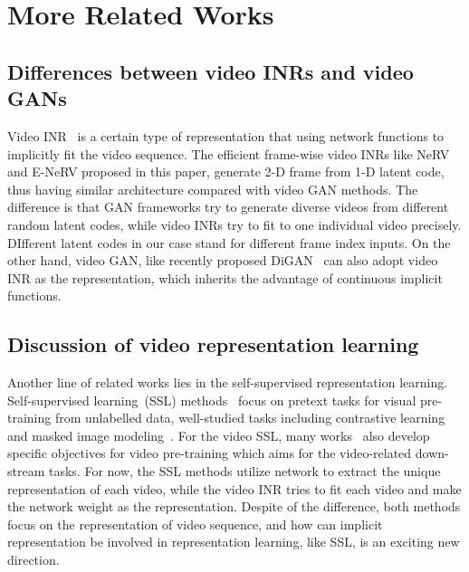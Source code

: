 \documentclass[runningheads]{llncs}
\begin{document}
\section{More Related Works}

\subsection{Differences between video INRs and video GANs}

Video INR~\cite{sitzmann2020implicit,mehta2021modulated} is a certain type of representation that using network functions to implicitly fit the video sequence. The efficient frame-wise video INRs like NeRV~\cite{chen2021nerv} and E-NeRV proposed in this paper, generate 2-D frame from 1-D latent code, thus having similar architecture compared with video GAN methods.  The difference is that GAN frameworks try to generate diverse videos from different random latent codes, while video INRs try to fit to one individual video precisely. DIfferent latent codes in our case stand for different frame index inputs. On the other hand, video GAN, like recently proposed DiGAN~\cite{yu2021generating} can also adopt video INR as the representation, which inherits the advantage of continuous implicit functions.

\subsection{Discussion of video representation learning}

Another line of related works lies in the self-supervised representation learning. Self-supervised learning~(SSL) methods~\cite{wu2018unsupervised,he2020momentum,chen2020simple,chen2021exploring,wang2021solving,he2022masked,chen2022context} focus on pretext tasks for visual pre-training from unlabelled data, well-studied tasks including contrastive learning~\cite{he2020momentum,chen2020simple,chen2021exploring} and masked image modeling~\cite{he2022masked,chen2022context}. For the video SSL, many works~\cite{wang2015unsupervised,lai2021video,liu2022tcgl,tong2022videomae} also develop specific objectives for video pre-training which aims for the video-related down-stream tasks. For now, the SSL methods utilize network to extract the unique representation of each video, while the video INR tries to fit each video and make the network weight as the representation. Despite of the difference, both methods focus on the representation of video sequence, and how can implicit representation be involved in representation learning, like SSL, is an exciting new direction.
\end{document}
